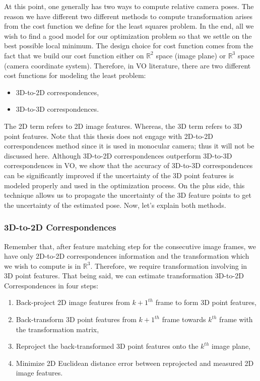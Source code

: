 \documentclass[12pt]{report}
\numberwithin{figure}{section}
\newcommand{\R}{\mathbb{R}}
\begin{document}
At this point, one generally has two ways to compute relative camera poses.  
The reason we have different two different methods to compute transformation 
arises 
from the cost function we define for the least squares problem. In the end, 
all we wish to find a good model for our optimization problem so that we 
settle on the best possible local minimum.  The design choice for cost 
function comes from the fact that we build our cost function either on $\R^2$ 
space (image plane) or $\R^3$ space (camera coordinate system).  Therefore, in 
VO literature, there are two different cost functions for modeling the least 
problem:

\begin{itemize}
  \item 3D-to-2D correspondences,
  \item 3D-to-3D correspondences.
\end{itemize}


The 2D term refers to 2D image features. Whereas, the 3D term refers to 3D 
point features.  Note that this thesis does not engage with 2D-to-2D 
correspondences method since it is used in monocular camera; thus it will not 
be discussed here. Although 3D-to-2D 
correspondences outperform 3D-to-3D correspondences in VO, we show that the 
accuracy of 3D-to-3D correspondences can be significantly improved if the 
uncertainty of the 3D point features is modeled properly and used in the 
optimization process.  On the plus side, this technique allows us to propagate 
the uncertainty of the 3D feature points to get the uncertainty of the 
estimated 
pose. Now, let's explain both methods.


\subsubsection{3D-to-2D Correspondences}\label{sb_sc_3d_to_2d}

Remember that, after feature matching step for the consecutive image frames, 
we have only 2D-to-2D correspondences information and the transformation which 
we wish to compute is in $\R^3$. Therefore, we require transformation 
involving in 3D point features. That being said, we can estimate 
transformation 3D-to-2D Correspondences in four steps:

\begin{enumerate}
  \item Back-project 2D image features from $k+1^{th}$ frame to form 3D point features,
  \item Back-transform 3D point features from $k+1^{th}$ frame towards $k^{th}$ frame 
    with the transformation matrix,
  \item Reproject the back-transformed 3D point features onto the $k^{th}$ image plane, 
  \item Minimize 2D Euclidean distance error between reprojected and measured 2D image features.
\end{enumerate}
\end{document}
